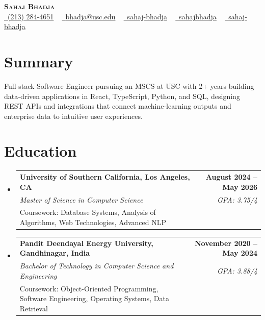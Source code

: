 \documentclass[letterpaper,10pt]{article}
\makeatletter
\newcommand{\resumeEduSubheading}[5]{\vspace{-1pt}\item\begin{tabular*}{1.0\textwidth}[t]{l@{\extracolsep{\fill}}r}\textbf{#1} & \textbf{\small #2} \\\textit{\small #3} & \textit{\small #4} \\\small #5 & \\\end{tabular*}\vspace{-4pt}}
\newcommand{\resumeSubHeadingListStart}{\begin{itemize}[leftmargin=0.0in, label={}]}
\newcommand{\resumeSubHeadingListEnd}{\end{itemize}}
\makeatother
\begin{document}
\begin{center}
{\Huge \scshape \textbf{Sahaj Bhadja}} \\ \vspace{1pt}
\small \href{tel:(213) 284-4651}{\faPhone\ \underline{(213) 284-4651}} ~ \href{mailto: bhadja@usc.edu}{\raisebox{-0.2\height}\faEnvelope\ \underline{bhadja@usc.edu}} ~
\href{https://www.linkedin.com/in/sahaj-bhadja/}{\raisebox{-0.2\height}\faLinkedin\ \underline{sahaj-bhadja}} ~ \href{https://github.com/SAHAJ-BHADJA}{\raisebox{-0.2\height}\faGithub\ \underline{sahajbhadja}} ~
\href{https://sahaj-bhadja.vercel.app/}{\raisebox{-0.2\height}\faGlobe\ \underline{sahaj-bhadja}}
\end{center}
\vspace{-16pt}
\section{Summary}
\begin{itemize}[leftmargin=0.15in, label={}]
\small{\item{Full-stack Software Engineer pursuing an MSCS at USC with 2+ years building data-driven applications in React, TypeScript, Python, and SQL, designing REST APIs and integrations that connect machine-learning outputs and enterprise data to intuitive user experiences.}}
\end{itemize}
\vspace{-6pt}
\section{Education}
\resumeSubHeadingListStart
\resumeEduSubheading{University of Southern California, Los Angeles, CA}{August 2024 -- May 2026}{Master of Science in Computer Science}{GPA: 3.75/4}{Coursework: Database Systems, Analysis of Algorithms, Web Technologies, Advanced NLP}
\vspace{-9pt}
\resumeEduSubheading{Pandit Deendayal Energy University, Gandhinagar, India}{November 2020 -- May 2024}{Bachelor of Technology in Computer Science and Engineering}{GPA: 3.88/4}{Coursework: Object-Oriented Programming, Software Engineering, Operating Systems, Data Retrieval}
\resumeSubHeadingListEnd
\vspace{-6pt}
\end{document}
